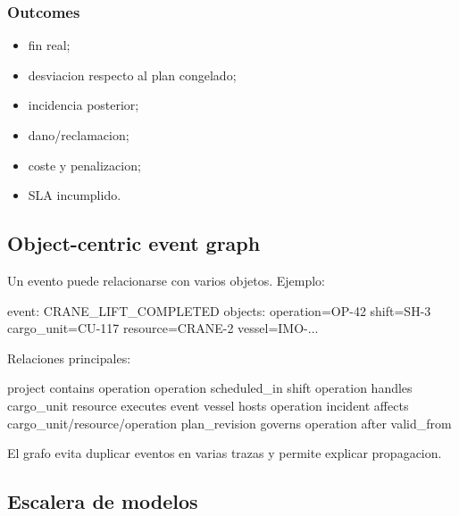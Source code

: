 \documentclass[
  spanish,
  10pt,
  a4paper,
]{article}
\newenvironment{Shaded}{}{}
\newcommand{\NormalTok}[1]{#1}
\providecommand{\tightlist}{%
  \setlength{\itemsep}{0pt}\setlength{\parskip}{0pt}}
\begin{document}
\subsubsection{Outcomes}\label{outcomes}

\begin{itemize}
\tightlist
\item
  fin real;
\item
  desviacion respecto al plan congelado;
\item
  incidencia posterior;
\item
  dano/reclamacion;
\item
  coste y penalizacion;
\item
  SLA incumplido.
\end{itemize}

\subsection{Object-centric event
graph}\label{object-centric-event-graph}

Un evento puede relacionarse con varios objetos. Ejemplo:

\begin{Shaded}
\begin{Highlighting}[]
\NormalTok{event: CRANE\_LIFT\_COMPLETED}
\NormalTok{objects:}
\NormalTok{  operation=OP{-}42}
\NormalTok{  shift=SH{-}3}
\NormalTok{  cargo\_unit=CU{-}117}
\NormalTok{  resource=CRANE{-}2}
\NormalTok{  vessel=IMO{-}...}
\end{Highlighting}
\end{Shaded}

Relaciones principales:

\begin{Shaded}
\begin{Highlighting}[]
\NormalTok{project contains operation}
\NormalTok{operation scheduled\_in shift}
\NormalTok{operation handles cargo\_unit}
\NormalTok{resource executes event}
\NormalTok{vessel hosts operation}
\NormalTok{incident affects cargo\_unit/resource/operation}
\NormalTok{plan\_revision governs operation after valid\_from}
\end{Highlighting}
\end{Shaded}

El grafo evita duplicar eventos en varias trazas y permite explicar
propagacion.

\subsection{Escalera de modelos}\label{escalera-de-modelos}
\end{document}
